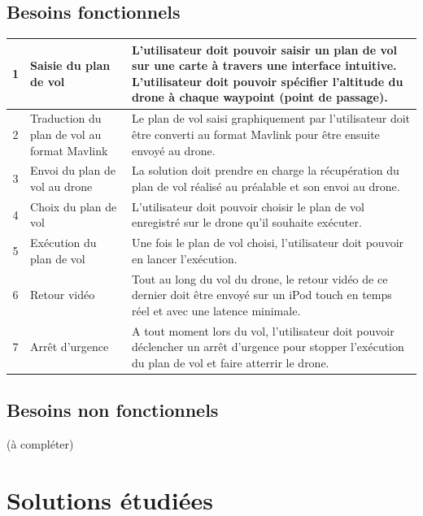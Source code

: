 \documentclass{article}
\begin{document}
	\subsection{Besoins fonctionnels}
	    \begin{center}
        \begin{tabularx}{15cm}{|c|p{4cm}|X|}
            \hline
            1 & Saisie du plan de vol & L'utilisateur doit pouvoir saisir un plan de vol sur une carte à travers une interface intuitive. L'utilisateur doit pouvoir spécifier l'altitude du drone à chaque waypoint (point de passage).\\
            \hline
            2 & Traduction du plan de vol au format Mavlink & Le plan de vol saisi graphiquement par l'utilisateur doit être converti au format Mavlink pour être ensuite envoyé au drone.\\
            \hline
            3 & Envoi du plan de vol au drone & La solution doit prendre en charge la récupération du plan de vol réalisé au préalable et son envoi au drone. \\
            \hline
            4 & Choix du plan de vol  & L'utilisateur doit pouvoir choisir le plan de vol enregistré sur le drone qu'il souhaite exécuter. \\
            \hline
            5 & Exécution du plan de vol  & Une fois le plan de vol choisi, l'utilisateur doit pouvoir en lancer l'exécution. \\
            \hline
            6 & Retour vidéo  & Tout au long du vol du drone, le retour vidéo de ce dernier doit être envoyé sur un iPod touch en temps réel et avec une latence minimale. \\
            \hline
            7 & Arrêt d'urgence  & A tout moment lors du vol, l'utilisateur doit pouvoir déclencher un arrêt d'urgence pour stopper l'exécution du plan de vol et faire atterrir le drone. \\
            \hline
        \end{tabularx}
        \end{center}
	\subsection{Besoins non fonctionnels}
	(à compléter)\\
\section{Solutions étudiées}
\end{document}
